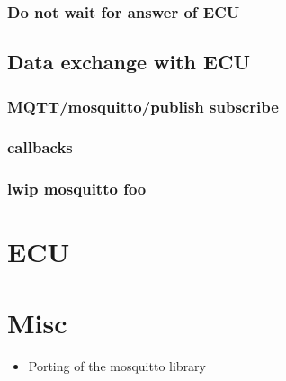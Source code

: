 \documentclass[paper=a4, fontsize=11pt]{scrartcl}
\begin{document}
  \subsubsection{Do not wait for answer of ECU}
\subsection{Data exchange with ECU}
  \subsubsection{MQTT/mosquitto/publish subscribe}
  \subsubsection{callbacks}
  \subsubsection{lwip mosquitto foo}
\section{ECU}
\section{Misc}
\begin{itemize}
  \item Porting of the mosquitto library %
\end{itemize}
\end{document}
